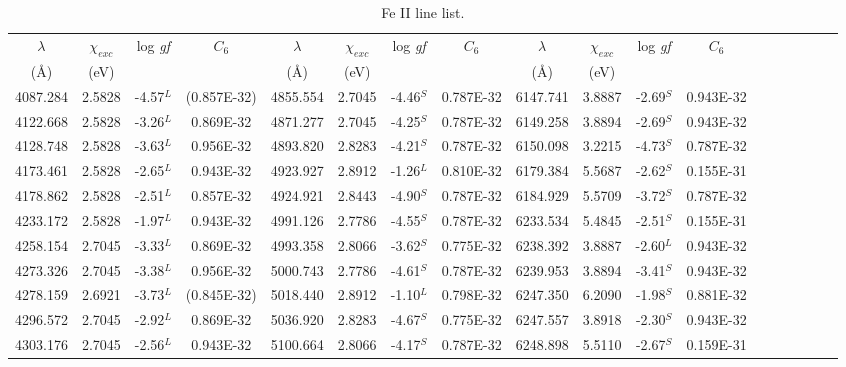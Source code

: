 \documentclass[traditabstract]{aa} %
\begin{document}
\begin{table}
\begin{minipage}[t]{\textwidth}
\caption{Fe II line list.}
\label{fe2list}
\centering          
\renewcommand{\footnoterule}{}  %
\begin{tabular}{cccccccccccccccccc} 
\hline\hline                
\scriptsize
{$\lambda$} & {$\chi_{exc}$} & {log {\it gf}} & $C_6$ & {$\lambda$} & {$\chi_{exc}$} & {log {\it gf}} & $C_6$ & {$\lambda$} & {$\chi_{exc}$} & {log {\it gf}} & $C_6$\\
{({\rm \AA})}   & {(eV)}  & {}  & {} & {({\rm \AA})}   & {(eV)}  & {}  & {} & {({\rm \AA})}   & {(eV)}  & {}  & {} \\
\hline    
 4087.284 & 2.5828 &-4.57$^L$ & (0.857E-32)& 4855.554 & 2.7045 &-4.46$^S$ & 0.787E-32  & 6147.741 & 3.8887 &-2.69$^S$ & 0.943E-32  \\ 
 4122.668 & 2.5828 &-3.26$^L$ & 0.869E-32  & 4871.277 & 2.7045 &-4.25$^S$ & 0.787E-32  & 6149.258 & 3.8894 &-2.69$^S$ & 0.943E-32  \\ 
 4128.748 & 2.5828 &-3.63$^L$ & 0.956E-32  & 4893.820 & 2.8283 &-4.21$^S$ & 0.787E-32  & 6150.098 & 3.2215 &-4.73$^S$ & 0.787E-32  \\ 
 4173.461 & 2.5828 &-2.65$^L$ & 0.943E-32  & 4923.927 & 2.8912 &-1.26$^L$ & 0.810E-32  & 6179.384 & 5.5687 &-2.62$^S$ & 0.155E-31  \\ 
 4178.862 & 2.5828 &-2.51$^L$ & 0.857E-32  & 4924.921 & 2.8443 &-4.90$^S$ & 0.787E-32  & 6184.929 & 5.5709 &-3.72$^S$ & 0.787E-32  \\ 
 4233.172 & 2.5828 &-1.97$^L$ & 0.943E-32  & 4991.126 & 2.7786 &-4.55$^S$ & 0.787E-32  & 6233.534 & 5.4845 &-2.51$^S$ & 0.155E-31  \\ 
 4258.154 & 2.7045 &-3.33$^L$ & 0.869E-32  & 4993.358 & 2.8066 &-3.62$^S$ & 0.775E-32  & 6238.392 & 3.8887 &-2.60$^L$ & 0.943E-32  \\ 
 4273.326 & 2.7045 &-3.38$^L$ & 0.956E-32  & 5000.743 & 2.7786 &-4.61$^S$ & 0.787E-32  & 6239.953 & 3.8894 &-3.41$^S$ & 0.943E-32  \\ 
 4278.159 & 2.6921 &-3.73$^L$ & (0.845E-32)& 5018.440 & 2.8912 &-1.10$^L$ & 0.798E-32  & 6247.350 & 6.2090 &-1.98$^S$ & 0.881E-32  \\ 
 4296.572 & 2.7045 &-2.92$^L$ & 0.869E-32  & 5036.920 & 2.8283 &-4.67$^S$ & 0.775E-32  & 6247.557 & 3.8918 &-2.30$^S$ & 0.943E-32  \\ 
 4303.176 & 2.7045 &-2.56$^L$ & 0.943E-32  & 5100.664 & 2.8066 &-4.17$^S$ & 0.787E-32  & 6248.898 & 5.5110 &-2.67$^S$ & 0.159E-31  \\ 

\end{tabular}
\end{minipage}
\end{table}
\end{document}
